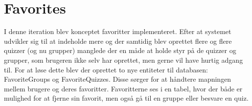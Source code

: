 \section{Favorites}
I denne iteration blev konceptet favoritter implementeret. Efter at systemet udvikler sig til at indeholde mere og der samtidig blev oprettet flere og flere quizzer (og nu grupper) manglede der en måde at holde styr på de quizzer og grupper, som brugeren ikke selv har oprettet, men gerne vil have hurtig adgang til. For at løse dette blev der oprettet to nye entiteter til databasen: FavoriteGroups og FavoriteQuizzes. Disse sørger for at håndtere mapningen mellem brugere og deres favoritter. Favoritterne ses i en tabel, hvor der både er mulighed for at fjerne sin favorit, men også gå til en gruppe eller besvare en quiz.